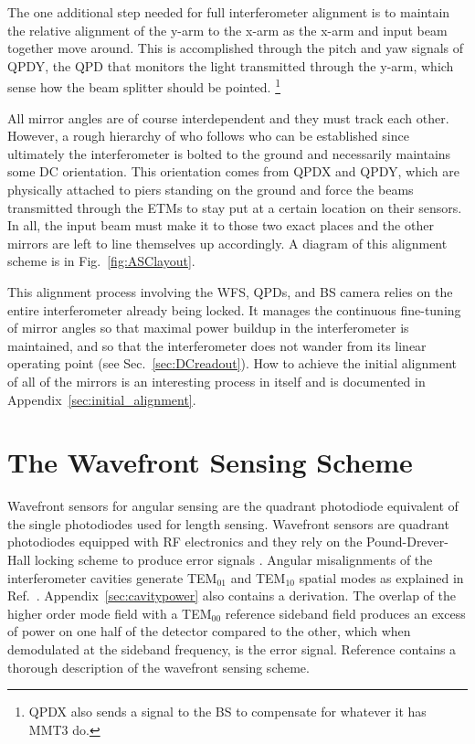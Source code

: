 The one additional step needed for full interferometer alignment is to maintain the relative alignment of the y-arm to the x-arm as the x-arm and input beam together move around. This is accomplished through the pitch and yaw signals of QPDY, the QPD that monitors the light transmitted through the y-arm, which sense how the beam splitter should be pointed. \footnote{QPDX also sends a signal to the BS to compensate for whatever it has MMT3 do.}

All mirror angles are of course interdependent and they must track each other. However, a rough hierarchy of who follows who can be established since ultimately the interferometer is bolted to the ground and necessarily maintains some DC orientation. This orientation comes from QPDX and QPDY, which are physically attached to piers standing on the ground and force the beams transmitted through the ETMs to stay put at a certain location on their sensors. In all, the input beam must make it to those two exact places and the other mirrors are left to line themselves up accordingly. A diagram of this alignment scheme is in Fig.~\ref{fig:ASClayout}.


This alignment process involving the WFS, QPDs, and BS camera relies on the entire interferometer already being locked. It manages the continuous fine-tuning of mirror angles so that maximal power buildup in the interferometer is maintained, and so that the interferometer does not wander from its linear operating point (see Sec.~\ref{sec:DCreadout}). How to achieve the initial alignment of all of the mirrors is an interesting process in itself and is documented in Appendix~\ref{sec:initial_alignment}.




\section{The Wavefront Sensing Scheme}
\label{sec:WFSsensing}
Wavefront sensors for angular sensing are the quadrant photodiode equivalent of the single photodiodes used for length sensing. Wavefront sensors are quadrant photodiodes equipped with RF electronics and they rely on the Pound-Drever-Hall locking scheme to produce error signals \cite{Sigg1996Wavefront}. Angular misalignments of the interferometer cavities generate TEM$_{01}$ and TEM$_{10}$ spatial modes as explained in Ref.~\cite{Anderson1984Alignment}. Appendix~\ref{sec:cavitypower} also contains a derivation. The overlap of the higher order mode field with a TEM$_{00}$ reference sideband field produces an excess of power on one half of the detector compared to the other, which when demodulated at the sideband frequency, is the error signal. Reference \cite{Fritschel1998Alignment} contains a thorough description of the wavefront sensing scheme.



